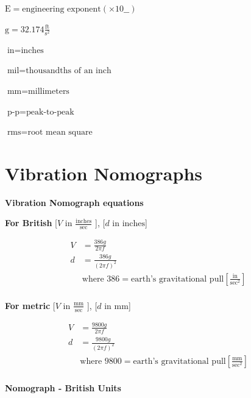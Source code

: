 \documentclass[
]{book}
\begin{document}
\(\mathrm{E} = \text{engineering exponent} \left(\times 10 \_\_ \right)\)

\(\text{g} = 32.174 \frac{\text{ft}}{\text{s}^2}\)

\(\text{in} = \text{inches}\)

\(\text{mil} = \text{thousandths of an inch}\)

\(\text{mm} = \text{millimeters}\)

\(\text{p-p} = \text{peak-to-peak}\)

\(\text{rms} = \text{root mean square}\)

\hypertarget{vibration-nomographs}{%
\section{Vibration Nomographs}\label{vibration-nomographs}}

\textbf{Vibration Nomograph equations}

\textbf{For British} {[}\(V\) in \(\frac{\text{inches}}{\text{sec}}\) {]}, {[}\(d\) in \(\text{inches}\){]}

\[
\begin{align}
V &= \frac{386 g}{2 \pi f} \\
d &= \frac{386 g}{\left( 2 \pi f \right)^2} \\
&\text{where } 386 = \text{earth's gravitational pull} \left[ \frac{\text{in}}{\text{sec}^2}  \right] \\
\end{align}
\]

\textbf{For metric} {[}\(V\) in \(\frac{\text{mm}}{\text{sec}}\) {]}, {[}\(d\) in \(\text{mm}\){]}

\[
\begin{align}
V &= \frac{9800 g}{2 \pi f} \\
d &= \frac{9800 g}{\left( 2 \pi f \right)^2} \\
&\text{where } 9800 = \text{earth's gravitational pull} \left[ \frac{\text{mm}}{\text{sec}^2}  \right] \\
\end{align}
\]

\textbf{Nomograph - British Units}
\end{document}
